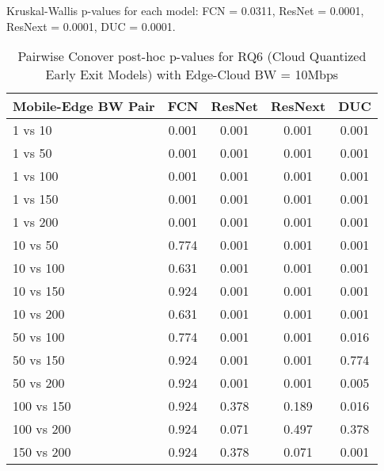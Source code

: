 \begin{table}[h]
\centering
\caption{Pairwise Conover post-hoc p-values for RQ6 (Cloud Quantized Early Exit Models) with Edge-Cloud BW = 10Mbps}
\label{tab:conover_cloud_quantized_earlyexit_ec10}
\smallskip
Kruskal-Wallis p-values for each model: FCN = 0.0311, ResNet = 0.0001, ResNext = 0.0001, DUC = 0.0001.

\begin{tabular}{lcccc}
\toprule
Mobile-Edge BW Pair & FCN & ResNet & ResNext & DUC \\
\midrule
1 vs 10 & 0.001 & 0.001 & 0.001 & 0.001 \\
1 vs 50 & 0.001 & 0.001 & 0.001 & 0.001 \\
1 vs 100 & 0.001 & 0.001 & 0.001 & 0.001 \\
1 vs 150 & 0.001 & 0.001 & 0.001 & 0.001 \\
1 vs 200 & 0.001 & 0.001 & 0.001 & 0.001 \\
10 vs 50 & 0.774 & 0.001 & 0.001 & 0.001 \\
10 vs 100 & 0.631 & 0.001 & 0.001 & 0.001 \\
10 vs 150 & 0.924 & 0.001 & 0.001 & 0.001 \\
10 vs 200 & 0.631 & 0.001 & 0.001 & 0.001 \\
50 vs 100 & 0.774 & 0.001 & 0.001 & 0.016 \\
50 vs 150 & 0.924 & 0.001 & 0.001 & 0.774 \\
50 vs 200 & 0.924 & 0.001 & 0.001 & 0.005 \\
100 vs 150 & 0.924 & 0.378 & 0.189 & 0.016 \\
100 vs 200 & 0.924 & 0.071 & 0.497 & 0.378 \\
150 vs 200 & 0.924 & 0.378 & 0.071 & 0.001 \\
\bottomrule
\end{tabular}
\end{table}

